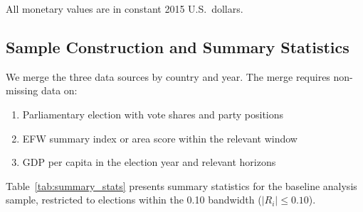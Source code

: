 \documentclass[12pt,a4paper]{article}
\begin{document}
All monetary values are in constant 2015 U.S.\ dollars.

\subsection{Sample Construction and Summary Statistics}

We merge the three data sources by country and year. The merge requires 
non-missing data on:
\begin{enumerate}[noitemsep]
    \item Parliamentary election with vote shares and party positions
    \item EFW summary index or area score within the relevant window
    \item GDP per capita in the election year and relevant horizons
\end{enumerate}

Table~\ref{tab:summary_stats} presents summary statistics for the baseline 
analysis sample, restricted to elections within the 0.10 bandwidth 
($|R_i| \leq 0.10$).
\end{document}
